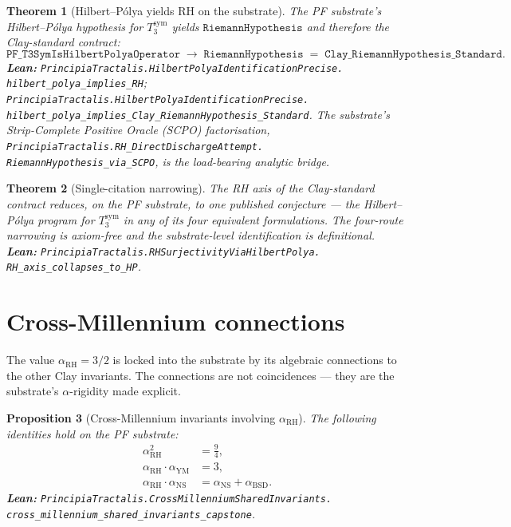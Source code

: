 \documentclass[11pt,a4paper]{article}
\theoremstyle{plain}
\newtheorem{theorem}{Theorem}[section]
\newtheorem{proposition}[theorem]{Proposition}
\theoremstyle{definition}
\begin{document}
\begin{theorem}[Hilbert--P\'olya yields RH on the substrate]
\label{thm:hp-rh}
The PF substrate's Hilbert--P\'olya hypothesis for $T_{3}^{\mathrm{sym}}$
yields $\mathtt{RiemannHypothesis}$ and therefore the Clay-standard
contract:
\[
\mathtt{PF\_T3SymIsHilbertPolyaOperator}
\;\longrightarrow\;
\mathtt{RiemannHypothesis}
\;=\;
\mathtt{Clay\_RiemannHypothesis\_Standard}.
\]
\textbf{Lean:}
\texttt{PrincipiaTractalis.HilbertPolyaIdentificationPrecise.\\
hilbert\_polya\_implies\_RH};
\texttt{PrincipiaTractalis.HilbertPolyaIdentificationPrecise.\\
hilbert\_polya\_implies\_Clay\_RiemannHypothesis\_Standard}.
The substrate's Strip-Complete Positive Oracle (SCPO) factorisation,
\texttt{PrincipiaTractalis.RH\_DirectDischargeAttempt.\\
RiemannHypothesis\_via\_SCPO}, is the load-bearing analytic bridge.
\end{theorem}

\begin{theorem}[Single-citation narrowing]
\label{thm:single-citation}
The RH axis of the Clay-standard contract reduces, on the PF substrate,
to one published conjecture --- the Hilbert--P\'olya program for
$T_{3}^{\mathrm{sym}}$ in any of its four equivalent formulations. The
four-route narrowing is axiom-free and the substrate-level
identification is definitional.
\textbf{Lean:}
\texttt{PrincipiaTractalis.RHSurjectivityViaHilbertPolya.\\
RH\_axis\_collapses\_to\_HP}.
\end{theorem}

\section{Cross-Millennium connections}
\label{sec:cross-mill}

The value $\alpha_{\mathrm{RH}} = 3/2$ is locked into the substrate by
its algebraic connections to the other Clay invariants. The connections
are not coincidences --- they are the substrate's $\alpha$-rigidity
made explicit.

\begin{proposition}[Cross-Millennium invariants involving $\alpha_{\mathrm{RH}}$]
\label{prop:cross-mill}
The following identities hold on the PF substrate:
\[
\begin{aligned}
\alpha_{\mathrm{RH}}^{2} &= \frac{9}{4}, \\
\alpha_{\mathrm{RH}} \cdot \alpha_{\mathrm{YM}} &= 3, \\
\alpha_{\mathrm{RH}} \cdot \alpha_{\mathrm{NS}} &=
  \alpha_{\mathrm{NS}} + \alpha_{\mathrm{BSD}}.
\end{aligned}
\]
\textbf{Lean:}
\texttt{PrincipiaTractalis.CrossMillenniumSharedInvariants.\\
cross\_millennium\_shared\_invariants\_capstone}.
\end{proposition}
\end{document}
